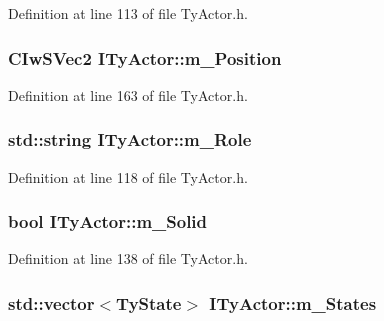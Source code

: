 Definition at line 113 of file TyActor.h.

\hypertarget{class_i_ty_actor_a296ffe4ccf5fad06daf002837b9ec128}{
\subsubsection[{m\_\-Position}]{\setlength{\rightskip}{0pt plus 5cm}CIwSVec2 {\bf ITyActor::m\_\-Position}}}
\label{class_i_ty_actor_a296ffe4ccf5fad06daf002837b9ec128}


Definition at line 163 of file TyActor.h.

\hypertarget{class_i_ty_actor_a92de9e18b7a31fc93b8bb775922078d4}{
\subsubsection[{m\_\-Role}]{\setlength{\rightskip}{0pt plus 5cm}std::string {\bf ITyActor::m\_\-Role}}}
\label{class_i_ty_actor_a92de9e18b7a31fc93b8bb775922078d4}


Definition at line 118 of file TyActor.h.

\hypertarget{class_i_ty_actor_a0365728019201a011e657ab56e36d06a}{
\subsubsection[{m\_\-Solid}]{\setlength{\rightskip}{0pt plus 5cm}bool {\bf ITyActor::m\_\-Solid}}}
\label{class_i_ty_actor_a0365728019201a011e657ab56e36d06a}


Definition at line 138 of file TyActor.h.

\hypertarget{class_i_ty_actor_aa07b4abe49314068f26fc471b994791e}{
\subsubsection[{m\_\-States}]{\setlength{\rightskip}{0pt plus 5cm}std::vector$<${\bf TyState}$>$ {\bf ITyActor::m\_\-States}}}
\label{class_i_ty_actor_aa07b4abe49314068f26fc471b994791e}



